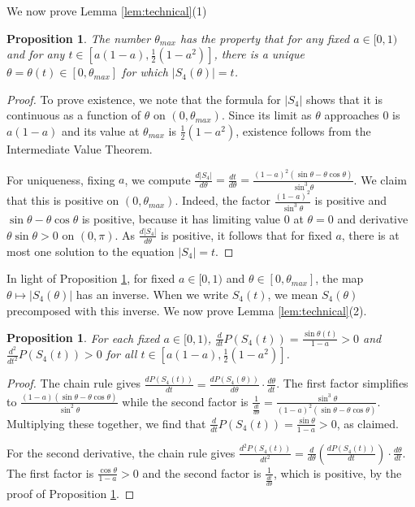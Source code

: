 \documentclass[leqno]{article}
\numberwithin{equation}{section}
\theoremstyle{definition}
\theoremstyle{remark}
\theoremstyle{plain}
\newtheorem{proposition}[equation]{Proposition}
\begin{document}
We now prove Lemma \ref{lem:technical}(1)


\begin{proposition}\label{prop:inverse} The number $\theta_{max}$ has the property that for any fixed $a\in [0,1)$ and for any $t\in \left[a(1-a), \frac{1}{2}(1-a^2)\right]$, there is a unique $\theta = \theta(t)\in [0,\theta_{max}]$ for which $|S_4(\theta)| = t$.

\end{proposition}

\begin{proof} To prove existence, we note that the formula for $|S_4|$ shows that it is continuous as a function of $\theta$ on $(0,\theta_{max})$.  Since its limit as $\theta$ approaches $0$ is $a(1-a)$ and its value at $\theta_{max}$ is $\frac{1}{2} (1-a^2)$, existence follows from the Intermediate Value Theorem.


For uniqueness, fixing $a$, we compute $\frac{d |S_4|}{d\theta} = \frac{dt}{d \theta} = \frac{(1-a)^2 (\sin\theta - \theta\cos\theta)}{\sin^3\theta}$.  We claim that this is positive on $(0,\theta_{max})$.  Indeed, the factor $\frac{(1-a)^2}{\sin^3 \theta}$ is positive and $\sin\theta - \theta\cos\theta$ is positive, because it has limiting value $0$ at $\theta = 0$ and derivative $\theta\sin\theta > 0$ on $(0,\pi)$.  As $\frac{d |S_4|}{d \theta}$ is positive, it follows that for fixed $a$, there is at most one solution to the equation $|S_4| =t$.
\end{proof}

In light of Proposition \ref{prop:inverse}, for fixed $a\in[0,1)$ and $\theta\in [0,\theta_{max}]$, the map $\theta\mapsto |S_4(\theta)|$ has an inverse.  When we write $S_4(t)$, we mean $S_4(\theta)$ precomposed with this inverse.  We now prove Lemma \ref{lem:technical}(2).

\begin{proposition}\label{prop:derivativebounds} For each fixed $a\in[0,1)$,  $\frac{d}{dt} P(S_4(t)) = \frac{\sin \theta(t)}{1-a} > 0$ and $\frac{d^2}{dt^2}P(S_4(t)) > 0$ for all $t\in \left[a(1-a), \frac{1}{2}(1-a^2)\right]$.

\end{proposition}

\begin{proof} The chain rule gives $\frac{d P(S_4(t))}{d t} = \frac{dP(S_4(\theta))}{d \theta} \cdot\frac{d\theta}{d t}$.  The first factor simplifies to $\frac{(1-a)(\sin\theta-\theta\cos\theta)}{\sin^2\theta}$ while the second factor is $\frac{1}{\frac{d t}{d \theta}} = \frac{\sin^3\theta}{(1-a)^2 (\sin\theta-\theta\cos \theta)}$.  Multiplying these together, we find that $\frac{d}{dt} P(S_4(t)) = \frac{\sin \theta}{1-a} > 0$, as claimed.

For the second derivative, the chain rule gives $\frac{d^2 P(S_4(t)) }{dt^2} = \frac{d}{d\theta}(\frac{dP(S_4(t))}{dt})\cdot \frac{d\theta}{dt}$.  The first factor is $\frac{\cos\theta}{1-a} > 0$ and the second factor is $\frac{1}{\frac{dt}{d\theta}}$, which is positive, by the proof of Proposition \ref{prop:inverse}.


\end{proof}
\end{document}
